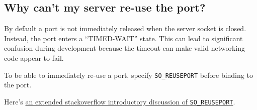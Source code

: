 \begin{Shaded}
\begin{Highlighting}[]
{{    \NormalTok{);}
     
    \StringTok{"Connection made: client_fd=%d}\CharTok{\textbackslash{}n}\StringTok{"}\NormalTok{, client_fd);}

    \DataTypeTok{char} \NormalTok{buffer[}\DecValTok{1000}\NormalTok{];}
    \DataTypeTok{int} \NormalTok{len = read(client_fd, buffer, }\KeywordTok{sizeof}\NormalTok{(buffer) - }\DecValTok{1}\NormalTok{);}
    \NormalTok{buffer[len] = '\textbackslash{}}\DecValTok{0}\NormalTok{';}

    \NormalTok{printf(}\StringTok{"Read %d chars}\CharTok{\textbackslash{}n}\StringTok{"}\NormalTok{, len);}
    \NormalTok{printf(}\StringTok{"===}\CharTok{\textbackslash{}n}\StringTok{"}\NormalTok{);}
    \NormalTok{printf(}\StringTok{"%s}\CharTok{\textbackslash{}n}\StringTok{"}\NormalTok{, buffer);}

    \KeywordTok{return} \DecValTok{0}\NormalTok{;}
\NormalTok{\}}
\end{Highlighting}
\end{Shaded}

\subsection{Why can't my server re-use the
port?}\label{why-cant-my-server-re-use-the-port}

By default a port is not immediately released when the server socket is
closed. Instead, the port enters a ``TIMED-WAIT'' state. This can lead
to significant confusion during development because the timeout can make
valid networking code appear to fail.

To be able to immediately re-use a port, specify \texttt{SO\_REUSEPORT}
before binding to the port.

\begin{Shaded}
\begin{Highlighting}[]
 \NormalTok{;}

\end{Highlighting}
\end{Shaded}

Here's
\href{http://stackoverflow.com/questions/14388706/socket-options-so-reuseaddr-and-so-reuseport-how-do-they-differ-do-they-mean-t}{an
extended stackoverflow introductory discussion of
\texttt{SO\_REUSEPORT}}.

